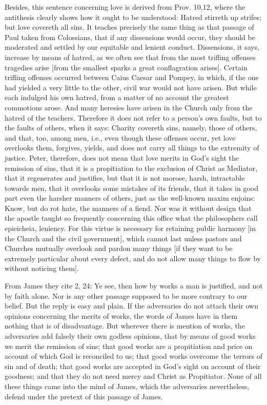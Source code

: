 Besides, this sentence concerning love is derived from Prov. 10,12,
where the antithesis clearly shows how it ought to be understood:
Hatred stirreth up strifes; but love covereth all sins.  It teaches
precisely the same thing as that passage of Paul taken from
Colossians, that if any dissensions would occur, they should be
moderated and settled by our equitable and lenient conduct.
Dissensions, it says, increase by means of hatred, as we often see
that from the most trifling offenses tragedies arise [from the
smallest sparks a great conflagration arises].  Certain trifling
offenses occurred between Caius Caesar and Pompey, in which, if the
one had yielded a very little to the other, civil war would not have
arisen.  But while each indulged his own hatred, from a matter of no
account the greatest commotions arose.  And many heresies have arisen
in the Church only from the hatred of the teachers.  Therefore it
does not refer to a person's own faults, but to the faults of others,
when it says: Charity covereth sins, namely, those of others, and
that, too, among men, i.e., even though these offenses occur, yet
love overlooks them, forgives, yields, and does not carry all things
to the extremity of justice.  Peter, therefore, does not mean that
love merits in God's sight the remission of sins, that it is a
propitiation to the exclusion of Christ as Mediator, that it
regenerates and justifies, but that it is not morose, harsh,
intractable towards men, that it overlooks some mistakes of its
friends, that it takes in good part even the harsher manners of
others, just as the well-known maxim enjoins: Know, but do rot hate,
the manners of a fiend.  Nor was it without design that the apostle
taught so frequently concerning this office what the philosophers
call epieicheia, leniency.  For this virtue is necessary for
retaining public harmony [in the Church and the civil government],
which cannot last unless pastors and Churches mutually overlook and
pardon many things [if they want to be extremely particular about
every defect, and do not allow many things to flow by without
noticing them].

From James they cite 2, 24: Ye see, then how by works a man is
justified, and not by faith alone.  Nor is any other passage supposed
to be more contrary to our belief.  But the reply is easy and plain.
If the adversaries do not attach their own opinions concerning the
merits of works, the words of James have in them nothing that is of
disadvantage.  But wherever there is mention of works, the
adversaries add falsely their own godless opinions, that by means of
good works we merit the remission of sins; that good works are a
propitiation and price on account of which God is reconciled to us;
that good works overcome the terrors of sin and of death; that good
works are accepted in God's sight on account of their goodness; and
that they do not need mercy and Christ as Propitiator.  None of all
these things came into the mind of James, which the adversaries
nevertheless, defend under the pretext of this passage of James.

